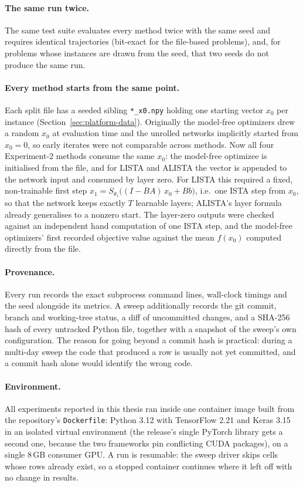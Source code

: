 \paragraph{The same run twice.}
The same test suite evaluates every method twice with the same seed and
requires identical trajectories (bit-exact for the file-based problems), and,
for problems whose instances are drawn from the seed, that two seeds do not
produce the same run.

\paragraph{Every method starts from the same point.}
Each split file has a seeded sibling \texttt{*\_x0.npy} holding one starting
vector $x_0$ per instance (Section~\ref{sec:platform-data}). Originally the
model-free optimizers drew a random $x_0$ at evaluation time and the unrolled
networks implicitly started from $x_0 = 0$, so early iterates were not
comparable across methods. Now all four Experiment-2 methods consume the same
$x_0$: the model-free optimizee is initialised from the file, and for LISTA
and ALISTA the vector is appended to the network input and consumed by layer
zero. For LISTA this required a fixed, non-trainable first step
$x_1 = S_{\theta_1}\big((I - BA)\,x_0 + B b\big)$, i.e.\ one ISTA step from
$x_0$, so that the network keeps exactly $T$ learnable layers; ALISTA's layer
formula already generalises to a nonzero start. The layer-zero outputs were
checked against an independent hand computation of one ISTA step, and the
model-free optimizers' first recorded objective value against the mean
$f(x_0)$ computed directly from the file.

\paragraph{Provenance.}
Every run records the exact subprocess command lines, wall-clock timings and
the seed alongside its metrics. A sweep additionally records the git commit,
branch and working-tree status, a diff of uncommitted changes, and a SHA-256
hash of every untracked Python file, together with a snapshot of the sweep's
own configuration. The reason for going beyond a commit hash is practical:
during a multi-day sweep the code that produced a row is usually not yet
committed, and a commit hash alone would identify the wrong code.

\paragraph{Environment.}
All experiments reported in this thesis ran inside one container image built
from the repository's \texttt{Dockerfile}: Python 3.12 with TensorFlow 2.21
and Keras 3.15 in an isolated virtual environment (the release's single
PyTorch library gets a second one, because the two frameworks pin conflicting
CUDA packages), on a single 8\,GB consumer GPU. A run is resumable: the sweep
driver skips cells whose rows already exist, so a stopped container continues
where it left off with no change in results.

